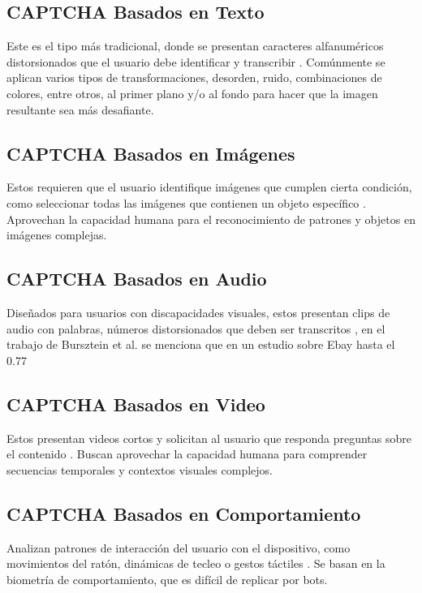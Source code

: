 \documentclass[conference]{IEEEtran}
\begin{document}
\subsection{CAPTCHA Basados en Texto}

Este es el tipo más tradicional, donde se presentan caracteres alfanuméricos distorsionados que el usuario debe identificar y transcribir \cite{VonAhn2003}. Comúnmente se aplican varios tipos de transformaciones, desorden, ruido, combinaciones de colores, entre otros, al primer plano y/o al fondo para hacer que la imagen resultante sea más desafiante. \cite{Algwil2023}

\subsection{CAPTCHA Basados en Imágenes}

Estos requieren que el usuario identifique imágenes que cumplen cierta condición, como seleccionar todas las imágenes que contienen un objeto específico \cite{Gossweiler2009}. Aprovechan la capacidad humana para el reconocimiento de patrones y objetos en imágenes complejas.

\subsection{CAPTCHA Basados en Audio}

Diseñados para usuarios con discapacidades visuales, estos presentan clips de audio con palabras, números distorsionados que deben ser transcritos \cite{Tam2008}, en el trabajo de Bursztein et al. \cite{Bursztein2011} se menciona que en un estudio sobre Ebay hasta el 0.77%

\subsection{CAPTCHA Basados en Video}

Estos presentan videos cortos y solicitan al usuario que responda preguntas sobre el contenido \cite{Kluever2009}. Buscan aprovechar la capacidad humana para comprender secuencias temporales y contextos visuales complejos.

\subsection{CAPTCHA Basados en Comportamiento}

Analizan patrones de interacción del usuario con el dispositivo, como movimientos del ratón, dinámicas de tecleo o gestos táctiles \cite{Murdoch2020}. Se basan en la biometría de comportamiento, que es difícil de replicar por bots.
\end{document}
